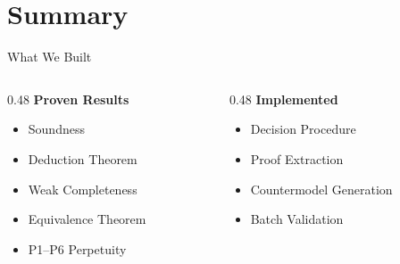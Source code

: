 \documentclass[aspectratio=169,11pt]{beamer}
\begin{document}
\section{Summary}

\begin{frame}{What We Built}

\begin{center}
\end{center}

\vspace{0.5cm}

\begin{columns}
\begin{column}{0.48\textwidth}
\textbf{Proven Results}
\begin{itemize}
    \item \textcolor{provengreen}{\checkmark} Soundness
    \item \textcolor{provengreen}{\checkmark} Deduction Theorem
    \item \textcolor{provengreen}{\checkmark} Weak Completeness
    \item \textcolor{provengreen}{\checkmark} Equivalence Theorem
    \item \textcolor{provengreen}{\checkmark} P1--P6 Perpetuity
\end{itemize}
\end{column}
\begin{column}{0.48\textwidth}
\textbf{Implemented}
\begin{itemize}
    \item \textcolor{provengreen}{\checkmark} Decision Procedure
    \item \textcolor{provengreen}{\checkmark} Proof Extraction
    \item \textcolor{provengreen}{\checkmark} Countermodel Generation
    \item \textcolor{provengreen}{\checkmark} Batch Validation
\end{itemize}
\end{column}
\end{columns}

\end{frame}
\end{document}
